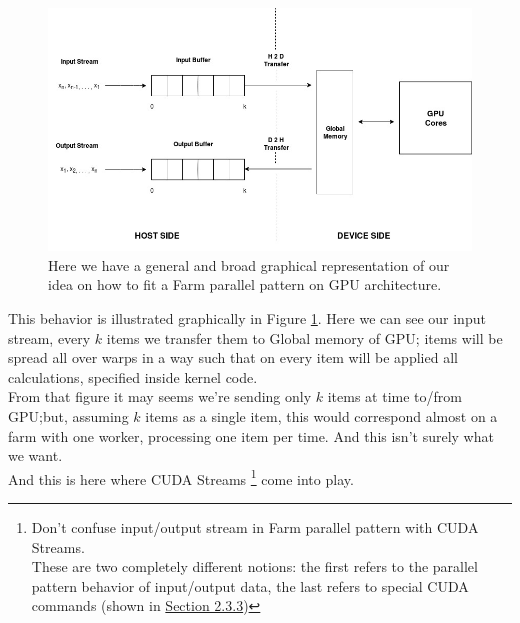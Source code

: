 	\begin{figure}
		\includegraphics[width=\linewidth]{images/H2D.jpg}
		\caption{Here we have a general and broad graphical representation of our idea on how to fit a Farm parallel pattern on GPU architecture.}
		\label{fig:H2D}
	\end{figure}
	
	This behavior is illustrated graphically in Figure \ref{fig:H2D}. Here we can see our input stream, every \(k\) items we transfer them to Global memory of GPU; items will be spread all over warps in a way such that on every item will be applied all calculations, specified inside kernel code.\\
	

	From that figure it may seems we're sending only \(k\) items at time to/from GPU;but, assuming \(k\) items as a single item, this would correspond almost on a farm with one worker, processing one item per time. And this isn't surely what we want.\\
	And this is here where CUDA Streams \footnote{Don't confuse input/output stream in Farm parallel pattern with CUDA Streams.\\ These are two completely different notions: the first refers to the parallel pattern behavior of input/output data, the last refers to special CUDA commands (shown in \hyperref[subs:streams]{Section 2.3.3})} come into play.\\
	
	
	
		
		
